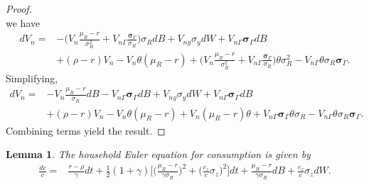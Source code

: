 \documentclass[11pt]{extarticle}
\theoremstyle{plain}
\newtheorem{lem}[thm]{Lemma}
\theoremstyle{definition}
\begin{document}
\begin{proof}
\begin{equation*}
	\end{equation*}
	we have 
	\begin{align*}
		dV_n = & - \bigg( V_n \frac{\mu_R - r}{\sigma_R^2 } + V_{n \Gamma} \frac{ \bm \sigma_\Gamma }{\sigma_R} \bigg) \sigma_R dB + V_{ny} \sigma_y dW + V_{n \Gamma}  \bm \sigma_\Gamma dB  \\
		&  + (\rho - r) V_n - V_n  \theta (\mu_R - r) + \bigg( V_n \frac{\mu_R - r}{\sigma_R^2 } + V_{n \Gamma} \frac{ \bm \sigma_\Gamma }{\sigma_R} \bigg) \theta  \sigma_R^2 - V_{n \Gamma} \theta \sigma_R  \bm \sigma_\Gamma. 
	\end{align*}
	Simplifying, 
	\begin{align*}
		dV_n = & -  V_n \frac{\mu_R - r}{\sigma_R} dB  - V_{n \Gamma}  \bm \sigma_\Gamma  dB + V_{ny} \sigma_y dW + V_{n \Gamma}  \bm \sigma_\Gamma dB  \\
		&  + (\rho - r) V_n - V_n  \theta (\mu_R - r) +  V_n (\mu_R - r)\theta + V_{n \Gamma}  \bm \sigma_\Gamma \theta  \sigma_R - V_{n \Gamma} \theta \sigma_R  \bm \sigma_\Gamma. 
	\end{align*}
	Combining terms yield the result. 
\end{proof}


\begin{lem}
	
	The household Euler equation for consumption is given by
	\begin{align*}
		\frac{dc}{c} = & \frac{r - \rho}{\gamma} dt + \frac{1}{2} (1+\gamma) \bigg[ \bigg( \frac{\mu_R - r}{\gamma \sigma_R} \bigg)^2 + \bigg( \frac{c_z}{c} \sigma_z \bigg)^2 \bigg] dt +  \frac{\mu_R - r}{\gamma \sigma_R} dB  + \frac{c_z}{c} \sigma_z dW .
	\end{align*}	
\end{lem}
\end{document}
